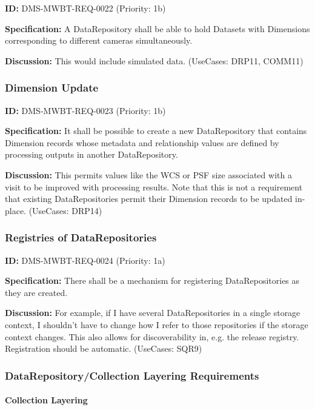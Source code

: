 \documentclass[SE,toc,lsstdraft]{lsstdoc}
\begin{document}
\label{DMS-MWBT-REQ-0022}
\textbf{ID:} DMS-MWBT-REQ-0022 (Priority: 1b)

\textbf{Specification:}
A DataRepository shall be able to hold Datasets with Dimensions corresponding to different cameras simultaneously.

\textbf{Discussion:}
This would include simulated data. (UseCases: DRP11, COMM11)

\subsubsection{Dimension Update}

\label{DMS-MWBT-REQ-0023}
\textbf{ID:} DMS-MWBT-REQ-0023 (Priority: 1b)

\textbf{Specification:}
It shall be possible to create a new DataRepository that contains Dimension records whose metadata and relationship values are defined by processing outputs in another DataRepository.

\textbf{Discussion:}
This permits values like the WCS or PSF size associated with a visit to be improved with processing results. Note that this is not a requirement that existing DataRepositories permit their Dimension records to be updated in-place. (UseCases: DRP14)

\subsubsection{Registries of DataRepositories}

\label{DMS-MWBT-REQ-0024}
\textbf{ID:} DMS-MWBT-REQ-0024 (Priority: 1a)

\textbf{Specification:}
There shall be a mechanism for registering DataRepositories as they are created.

\textbf{Discussion:}
For example, if I have several DataRepositories in a single storage context, I shouldn't have to change how I refer to those repositories if the storage context changes. This also allows for discoverability in, e.g. the release registry. Registration should be automatic. (UseCases: SQR9)

\subsubsection{DataRepository/Collection Layering Requirements}

\paragraph{Collection Layering}\hfill  %
\end{document}
